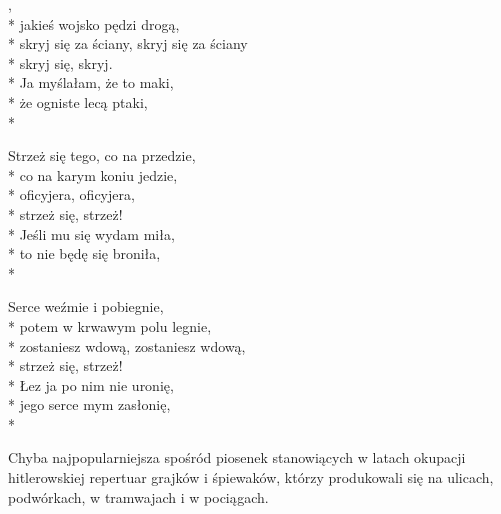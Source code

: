 
\begin{lyrics}[longestline={niech mnie zabiera, zabiera, zabiera.}]

,\\*
jakieś wojsko pędzi drogą,\\*
skryj się za ściany, skryj się za ściany\\*
skryj się, skryj.\\*
\vin Ja myślałam, że to maki,\\*
\vin że ogniste lecą ptaki,\\*

Strzeż się tego, co na przedzie,\\*
co na karym koniu jedzie,\\*
oficyjera, oficyjera,\\*
strzeż się, strzeż!\\*
\vin Jeśli mu się wydam miła,\\*
\vin to nie będę się broniła,\\*

Serce weźmie i pobiegnie,\\*
potem w krwawym polu legnie,\\*
zostaniesz wdową, zostaniesz wdową,\\*
strzeż się, strzeż!\\*
\vin Łez ja po nim nie uronię,\\*
\vin jego serce mym zasłonię,\\*
\end{lyrics}

\begin{info}Chyba najpopularniejsza spośród piosenek stanowiących w latach okupacji hitlerowskiej repertuar grajków i śpiewaków, którzy produkowali się na ulicach, podwórkach, w tramwajach i w pociągach. \end{info}

